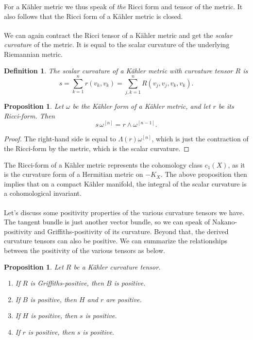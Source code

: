 \documentclass[11pt]{article}
\newtheorem{prop}[theo]{Proposition}
\newtheorem{defi}[theo]{Definition}
\newtheorem*{proof}{Proof}
\def\^#1{^{[#1]}}
\begin{document}
For a K\"ahler metric we thus speak of \emph{the} Ricci form and tensor of the metric. It also follows that the Ricci form of a K\"ahler metric is closed.


\paragraph{}
We can again contract the Ricci tensor of a K\"ahler metric and get the \emph{scalar curvature} of the metric. It is equal to the scalar curvature of the underlying Riemannian metric.

\begin{defi}
The \emph{scalar curvature} of a K\"ahler metric with curvature tensor $R$ is
$$
s = \sum_{k=1}^n r(v_k,v_k) = \sum_{j,k=1}^n R(v_j,v_j,v_k,v_k).
$$
\end{defi}


\begin{prop}
Let $\omega$ be the K\"ahler form of a K\"ahler metric, and let $r$ be its Ricci-form. Then
$$
s \, \omega\^{n} = r \wedge \omega\^{n-1}.
$$
\end{prop}

\begin{proof}
The right-hand side is equal to $\Lambda(r) \omega\^n$, which is just the contraction of the Ricci-form by the metric, which is the scalar curvature.
\end{proof}

The Ricci-form of a K\"ahler metric represents the cohomology class $c_1(X)$, as it is the curvature form of a Hermitian metric on $-K_X$. The above proposition then implies that on a compact K\"ahler manifold, the integral of the scalar curvature is a cohomological invariant.



\paragraph{}

Let's discuss some positivity properties of the various curvature tensors we have. The tangent bundle is just another vector bundle, so we can speak of Nakano-positivity and Griffiths-positivity of its curvature. Beyond that, the derived curvature tensors can also be positive. We can summarize the relationships between the positivity of the various tensors as below.


\begin{prop}
\label{prop:derived-tensor-positivity}
  Let $R$ be a K\"ahler curvature tensor.
  \begin{enumerate}
    \item If $R$ is Griffiths-positive, then $B$ is positive.
    \item If $B$ is positive, then $H$ and $r$ are positive.
    \item If $H$ is positive, then $s$ is positive.
    \item If $r$ is positive, then $s$ is positive.
  \end{enumerate}
\end{prop}
\end{document}
